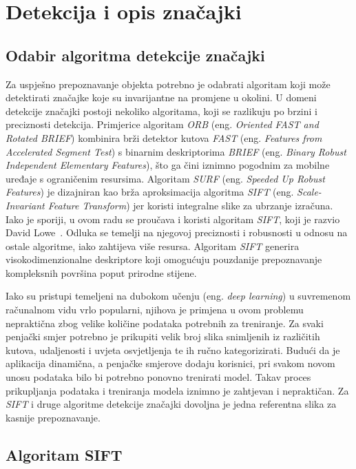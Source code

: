 \section{Detekcija i opis značajki}

\subsection{Odabir algoritma detekcije značajki}

Za uspješno prepoznavanje objekta potrebno je odabrati algoritam koji može detektirati značajke koje su invarijantne na promjene u okolini. U domeni detekcije značajki postoji nekoliko algoritama, koji se razlikuju po brzini i preciznosti detekcija. 
Primjerice algoritam \textit{ORB} (eng. \textit{Oriented FAST and Rotated BRIEF}) kombinira brži detektor kutova \textit{FAST} (eng. \textit{Features from Accelerated Segment Test}) s binarnim deskriptorima \textit{BRIEF} (eng. \textit{Binary Robust Independent Elementary Features}), što ga čini iznimno pogodnim za mobilne uređaje s ograničenim resursima.
Algoritam \textit{SURF} (eng. \textit{Speeded Up Robust Features}) je dizajniran kao brža aproksimacija algoritma \textit{SIFT} (eng. \textit{Scale-Invariant Feature Transform}) jer koristi integralne slike za ubrzanje izračuna. 
Iako je sporiji, u ovom radu se proučava i koristi algoritam \textit{SIFT}, koji je razvio David Lowe~\cite{lowe2004sift}. 
Odluka se temelji na njegovoj preciznosti i robusnosti u odnosu na ostale algoritme, iako zahtijeva više resursa. Algoritam \textit{SIFT} generira visokodimenzionalne deskriptore koji omogućuju pouzdanije prepoznavanje kompleksnih površina poput prirodne stijene. 

Iako su pristupi temeljeni na dubokom učenju (eng. \textit{deep learning}) u suvremenom računalnom vidu vrlo popularni, njihova je primjena u ovom problemu nepraktična zbog velike količine podataka potrebnih za treniranje. Za svaki penjački smjer potrebno je prikupiti velik broj slika snimljenih iz različitih kutova, udaljenosti i uvjeta osvjetljenja te ih ručno kategorizirati. Budući da je aplikacija dinamična, a penjačke smjerove dodaju korisnici, pri svakom novom unosu podataka bilo bi potrebno ponovno trenirati model. Takav proces prikupljanja podataka i treniranja modela iznimno je zahtjevan i nepraktičan. Za \textit{SIFT} i druge algoritme detekcije značajki dovoljna je jedna referentna slika za kasnije prepoznavanje. 

\subsection{Algoritam SIFT}

